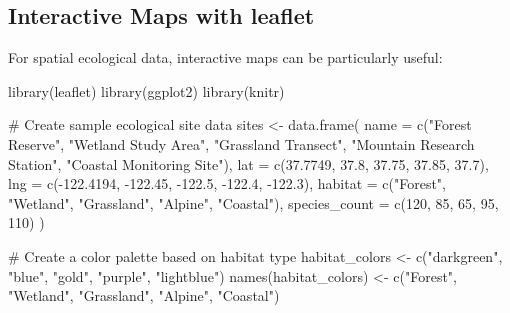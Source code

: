 \documentclass[
  letterpaper,
]{book}
\newenvironment{Shaded}{\begin{snugshade}}{\end{snugshade}}
\newcommand{\AttributeTok}[1]{\textcolor[rgb]{0.40,0.45,0.13}{#1}}
\newcommand{\CommentTok}[1]{\textcolor[rgb]{0.37,0.37,0.37}{#1}}
\newcommand{\DecValTok}[1]{\textcolor[rgb]{0.68,0.00,0.00}{#1}}
\newcommand{\FloatTok}[1]{\textcolor[rgb]{0.68,0.00,0.00}{#1}}
\newcommand{\FunctionTok}[1]{\textcolor[rgb]{0.28,0.35,0.67}{#1}}
\newcommand{\NormalTok}[1]{\textcolor[rgb]{0.00,0.23,0.31}{#1}}
\newcommand{\OtherTok}[1]{\textcolor[rgb]{0.00,0.23,0.31}{#1}}
\newcommand{\SpecialCharTok}[1]{\textcolor[rgb]{0.37,0.37,0.37}{#1}}
\newcommand{\StringTok}[1]{\textcolor[rgb]{0.13,0.47,0.30}{#1}}
\begin{document}
\subsection{Interactive Maps with
leaflet}\label{interactive-maps-with-leaflet}

For spatial ecological data, interactive maps can be particularly
useful:

\begin{Shaded}
\begin{Highlighting}[]
\FunctionTok{library}\NormalTok{(leaflet)}
\FunctionTok{library}\NormalTok{(ggplot2)}
\FunctionTok{library}\NormalTok{(knitr)}

\CommentTok{\# Create sample ecological site data}
\NormalTok{sites }\OtherTok{\textless{}{-}} \FunctionTok{data.frame}\NormalTok{(}
  \AttributeTok{name =} \FunctionTok{c}\NormalTok{(}\StringTok{"Forest Reserve"}\NormalTok{, }\StringTok{"Wetland Study Area"}\NormalTok{, }\StringTok{"Grassland Transect"}\NormalTok{, }
           \StringTok{"Mountain Research Station"}\NormalTok{, }\StringTok{"Coastal Monitoring Site"}\NormalTok{),}
  \AttributeTok{lat =} \FunctionTok{c}\NormalTok{(}\FloatTok{37.7749}\NormalTok{, }\FloatTok{37.8}\NormalTok{, }\FloatTok{37.75}\NormalTok{, }\FloatTok{37.85}\NormalTok{, }\FloatTok{37.7}\NormalTok{),}
  \AttributeTok{lng =} \FunctionTok{c}\NormalTok{(}\SpecialCharTok{{-}}\FloatTok{122.4194}\NormalTok{, }\SpecialCharTok{{-}}\FloatTok{122.45}\NormalTok{, }\SpecialCharTok{{-}}\FloatTok{122.5}\NormalTok{, }\SpecialCharTok{{-}}\FloatTok{122.4}\NormalTok{, }\SpecialCharTok{{-}}\FloatTok{122.3}\NormalTok{),}
  \AttributeTok{habitat =} \FunctionTok{c}\NormalTok{(}\StringTok{"Forest"}\NormalTok{, }\StringTok{"Wetland"}\NormalTok{, }\StringTok{"Grassland"}\NormalTok{, }\StringTok{"Alpine"}\NormalTok{, }\StringTok{"Coastal"}\NormalTok{),}
  \AttributeTok{species\_count =} \FunctionTok{c}\NormalTok{(}\DecValTok{120}\NormalTok{, }\DecValTok{85}\NormalTok{, }\DecValTok{65}\NormalTok{, }\DecValTok{95}\NormalTok{, }\DecValTok{110}\NormalTok{)}
\NormalTok{)}

\CommentTok{\# Create a color palette based on habitat type}
\NormalTok{habitat\_colors }\OtherTok{\textless{}{-}} \FunctionTok{c}\NormalTok{(}\StringTok{"darkgreen"}\NormalTok{, }\StringTok{"blue"}\NormalTok{, }\StringTok{"gold"}\NormalTok{, }\StringTok{"purple"}\NormalTok{, }\StringTok{"lightblue"}\NormalTok{)}
\FunctionTok{names}\NormalTok{(habitat\_colors) }\OtherTok{\textless{}{-}} \FunctionTok{c}\NormalTok{(}\StringTok{"Forest"}\NormalTok{, }\StringTok{"Wetland"}\NormalTok{, }\StringTok{"Grassland"}\NormalTok{, }\StringTok{"Alpine"}\NormalTok{, }\StringTok{"Coastal"}\NormalTok{)}


\end{Highlighting}
\end{Shaded}
\end{document}

